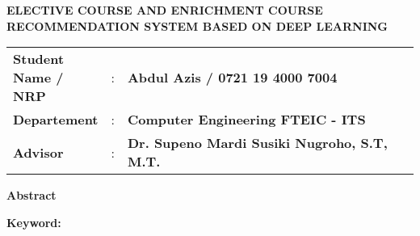 {
\begin{center}
    \uppercase{\textbf{\large Elective Course and Enrichment course recommendation system based on Deep Learning}}
\end{center}

\vspace*{6 mm}
\begin{adjustwidth}{}{}
    \begin{tabular}{lcp{1\linewidth}}
        \noindent\textbf{Student Name / NRP} & : & \textbf{Abdul Azis / 0721 19 4000 7004}             \\
        \noindent\textbf{Departement}        & : & \textbf{Computer Engineering FTEIC - ITS}           \\
        \noindent\textbf{Advisor}            & : & \textbf{Dr. Supeno Mardi Susiki Nugroho, S.T, M.T.} \\
    \end{tabular}
\end{adjustwidth}

\vspace{6 mm}
\noindent
\textbf{Abstract}
\vspace{3 mm}


\vspace{6 mm}
\noindent
\textbf{Keyword: }
}



